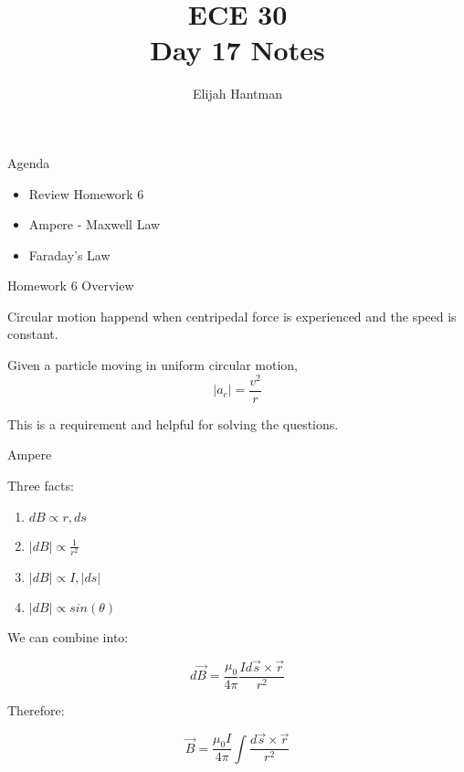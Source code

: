 \documentclass{report}
\title{\Huge{ECE 30}\\Day 17 Notes}
\author{\huge{Elijah Hantman}}
\date{}
\begin{document}
\maketitle
\newpage

\begin{description}
    \item {\large Agenda} 
        \begin{itemize}
            \item Review Homework 6
            \item Ampere - Maxwell Law
            \item Faraday's Law
        \end{itemize}
    \item {\large Homework 6 Overview}
        \begin{mdframed}
            Circular motion happend when centripedal
            force is experienced and the speed is constant.

            Given a particle moving in uniform circular motion,
            \begin{displaymath}
                |a_c| = \frac{v^2}{r}
            \end{displaymath}
            
            This is a requirement and helpful for solving the questions.
        \end{mdframed}
    \item {\large Ampere}
        \begin{mdframed}
            Three facts:
            \begin{enumerate}
                \item $dB \propto r, ds$
                \item $|dB| \propto \frac{1}{r^2}$
                \item $|dB| \propto I, |ds|$
                \item $|dB| \propto sin(\theta)$
            \end{enumerate}

            We can combine into:

            \begin{displaymath}
                d\vec{B} = \frac{\mu_0}{4\pi} \frac{I d\vec{s} \times \vec{r}}{r^2}
            \end{displaymath}

            Therefore:

            \begin{displaymath}
                \vec{B} = \frac{\mu_0 I}{4\pi} \int \frac{d\vec{s} \times \vec{r}}{r^2}
            \end{displaymath}


\end{mdframed}
\end{description}
\end{document}
